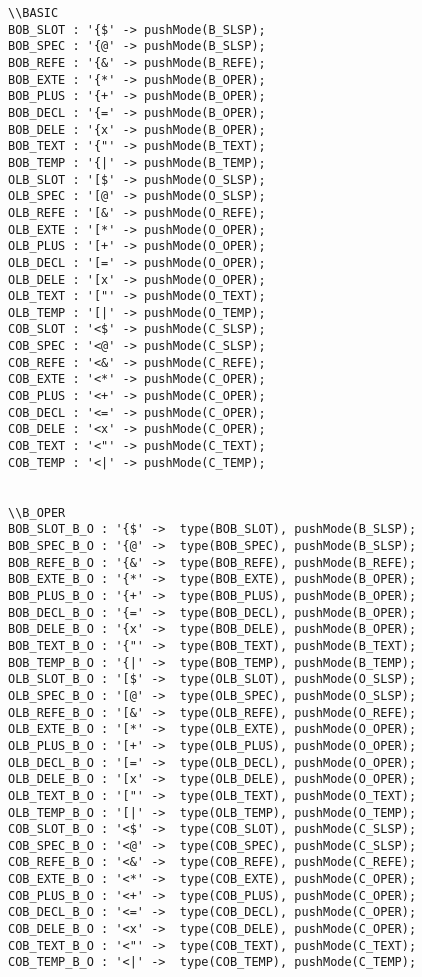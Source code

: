 \begin{verbatim}
\\BASIC
BOB_SLOT : '{$' -> pushMode(B_SLSP);
BOB_SPEC : '{@' -> pushMode(B_SLSP);
BOB_REFE : '{&' -> pushMode(B_REFE);
BOB_EXTE : '{*' -> pushMode(B_OPER);
BOB_PLUS : '{+' -> pushMode(B_OPER);
BOB_DECL : '{=' -> pushMode(B_OPER);
BOB_DELE : '{x' -> pushMode(B_OPER);
BOB_TEXT : '{"' -> pushMode(B_TEXT);
BOB_TEMP : '{|' -> pushMode(B_TEMP);
OLB_SLOT : '[$' -> pushMode(O_SLSP);
OLB_SPEC : '[@' -> pushMode(O_SLSP);
OLB_REFE : '[&' -> pushMode(O_REFE);
OLB_EXTE : '[*' -> pushMode(O_OPER);
OLB_PLUS : '[+' -> pushMode(O_OPER);
OLB_DECL : '[=' -> pushMode(O_OPER);
OLB_DELE : '[x' -> pushMode(O_OPER);
OLB_TEXT : '["' -> pushMode(O_TEXT);
OLB_TEMP : '[|' -> pushMode(O_TEMP);
COB_SLOT : '<$' -> pushMode(C_SLSP);
COB_SPEC : '<@' -> pushMode(C_SLSP);
COB_REFE : '<&' -> pushMode(C_REFE);
COB_EXTE : '<*' -> pushMode(C_OPER);
COB_PLUS : '<+' -> pushMode(C_OPER);
COB_DECL : '<=' -> pushMode(C_OPER);
COB_DELE : '<x' -> pushMode(C_OPER);
COB_TEXT : '<"' -> pushMode(C_TEXT);
COB_TEMP : '<|' -> pushMode(C_TEMP);


\\B_OPER
BOB_SLOT_B_O : '{$' ->  type(BOB_SLOT), pushMode(B_SLSP);
BOB_SPEC_B_O : '{@' ->  type(BOB_SPEC), pushMode(B_SLSP);
BOB_REFE_B_O : '{&' ->  type(BOB_REFE), pushMode(B_REFE);
BOB_EXTE_B_O : '{*' ->  type(BOB_EXTE), pushMode(B_OPER);
BOB_PLUS_B_O : '{+' ->  type(BOB_PLUS), pushMode(B_OPER);
BOB_DECL_B_O : '{=' ->  type(BOB_DECL), pushMode(B_OPER);
BOB_DELE_B_O : '{x' ->  type(BOB_DELE), pushMode(B_OPER);
BOB_TEXT_B_O : '{"' ->  type(BOB_TEXT), pushMode(B_TEXT);
BOB_TEMP_B_O : '{|' ->  type(BOB_TEMP), pushMode(B_TEMP);
OLB_SLOT_B_O : '[$' ->  type(OLB_SLOT), pushMode(O_SLSP);
OLB_SPEC_B_O : '[@' ->  type(OLB_SPEC), pushMode(O_SLSP);
OLB_REFE_B_O : '[&' ->  type(OLB_REFE), pushMode(O_REFE);
OLB_EXTE_B_O : '[*' ->  type(OLB_EXTE), pushMode(O_OPER);
OLB_PLUS_B_O : '[+' ->  type(OLB_PLUS), pushMode(O_OPER);
OLB_DECL_B_O : '[=' ->  type(OLB_DECL), pushMode(O_OPER);
OLB_DELE_B_O : '[x' ->  type(OLB_DELE), pushMode(O_OPER);
OLB_TEXT_B_O : '["' ->  type(OLB_TEXT), pushMode(O_TEXT);
OLB_TEMP_B_O : '[|' ->  type(OLB_TEMP), pushMode(O_TEMP);
COB_SLOT_B_O : '<$' ->  type(COB_SLOT), pushMode(C_SLSP);
COB_SPEC_B_O : '<@' ->  type(COB_SPEC), pushMode(C_SLSP);
COB_REFE_B_O : '<&' ->  type(COB_REFE), pushMode(C_REFE);
COB_EXTE_B_O : '<*' ->  type(COB_EXTE), pushMode(C_OPER);
COB_PLUS_B_O : '<+' ->  type(COB_PLUS), pushMode(C_OPER);
COB_DECL_B_O : '<=' ->  type(COB_DECL), pushMode(C_OPER);
COB_DELE_B_O : '<x' ->  type(COB_DELE), pushMode(C_OPER);
COB_TEXT_B_O : '<"' ->  type(COB_TEXT), pushMode(C_TEXT);
COB_TEMP_B_O : '<|' ->  type(COB_TEMP), pushMode(C_TEMP);


\end{verbatim}
